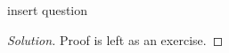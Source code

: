\begin{solution}{2.3}
    \begin{question}
        insert question    
    \end{question}
    \tcblower{}
    \begin{proof}[Solution]
        Proof is left as an exercise.
    \end{proof}
\end{solution}
